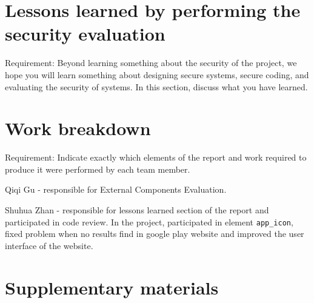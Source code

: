 \documentclass[12pt, a4paper]{article}
\newcommand{\code}[1]{\texttt{#1}}
\begin{document}
\section{Lessons learned by performing the security evaluation}

Requirement: Beyond learning something about the security of the project, we hope you will learn something about designing secure systems, secure coding, and evaluating the security of systems. In this section, discuss what you have learned.  

\section{Work breakdown}

Requirement:  Indicate exactly which elements of the report and work required to produce it were performed by each team member. 

Qiqi Gu - responsible for External Components Evaluation.

Shuhua Zhan - responsible for lessons learned section of the report and participated in code review. In the project, participated in element \code{app\_icon}, fixed problem when no results find in google play website and improved the user interface of the website.

\section{Supplementary materials}
\end{document}
